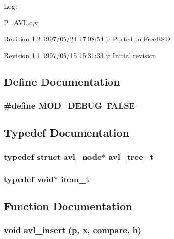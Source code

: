 \begin{Desc}
\item[Log: ]\par
 P\_\-AVL.c,v \end{Desc}
 Revision 1.2 1997/05/24 17:08:54 jr Ported to Free\-BSD

Revision 1.1 1997/05/15 15:31:33 jr Initial revision



\subsection{Define Documentation}
\subsubsection{\setlength{\rightskip}{0pt plus 5cm}\#define MOD\_\-DEBUG\ FALSE}\label{P__AVL_8c_a0}




\subsection{Typedef Documentation}
\subsubsection{\setlength{\rightskip}{0pt plus 5cm}typedef struct {\bf avl\_\-node}$\ast$ avl\_\-tree\_\-t}\label{P__AVL_8c_a2}


\subsubsection{\setlength{\rightskip}{0pt plus 5cm}typedef void$\ast$ item\_\-t}\label{P__AVL_8c_a1}




\subsection{Function Documentation}
\subsubsection{\setlength{\rightskip}{0pt plus 5cm}void avl\_\-insert (p, {\bf x}, {\bf compare}, {\bf h})}\label{P__AVL_8c_a7}


